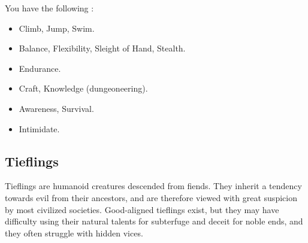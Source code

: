             You have the following :
            \begin{itemize}
                \item {} Climb, Jump, Swim.
                \item {} Balance, Flexibility, Sleight of Hand, Stealth.
                \item {} Endurance.
                \item {} Craft, Knowledge (dungeoneering).
                \item {} Awareness, Survival.
                \item {} Intimidate.
            \end{itemize}

    \subsection{Tieflings}

        Tieflings are humanoid creatures descended from fiends.
        They inherit a tendency towards evil from their ancestors, and are therefore viewed with great suspicion by most civilized societies.
        Good-aligned tieflings exist, but they may have difficulty using their natural talents for subterfuge and deceit for noble ends, and they often struggle with hidden vices.

